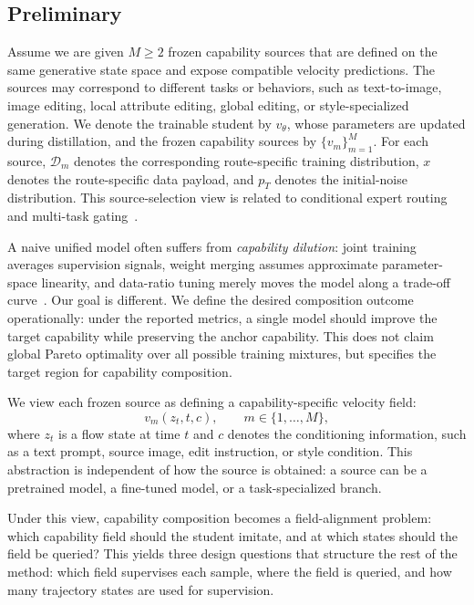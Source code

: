\documentclass{llmxive}
\begin{document}
\subsection{Preliminary}
\label{sec:composition-target}

Assume we are given $M\ge2$ frozen capability sources that are defined on the same generative state space and expose compatible velocity predictions. The sources may correspond to different tasks or behaviors, such as text-to-image, image editing, local attribute editing, global editing, or style-specialized generation. We denote the trainable student by $v_\theta$, whose parameters are updated during distillation, and the frozen capability sources by $\{v_m\}_{m=1}^{M}$. For each source, $\mathcal{D}_m$ denotes the corresponding route-specific training distribution, $x$ denotes the route-specific data payload, and $p_T$ denotes the initial-noise distribution. This source-selection view is related to conditional expert routing and multi-task gating~\cite{jacobs1991adaptive,shazeer2017outrageously,ma2018modeling}.

A naive unified model often suffers from \emph{capability dilution}: joint training averages supervision signals, weight merging assumes approximate parameter-space linearity, and data-ratio tuning merely moves the model along a trade-off curve~\cite{chen2018gradnorm,sener2018multi,yu2020gradient,liu2021conflict}. Our goal is different. We define the desired composition outcome operationally: under the reported metrics, a single model should improve the target capability while preserving the anchor capability. This does not claim global Pareto optimality over all possible training mixtures, but specifies the target region for capability composition.

We view each frozen source as defining a capability-specific velocity field:
\begin{equation}
  v_m(z_t,t,c), \qquad m\in\{1,\ldots,M\},
  \label{eq:cap-field}
\end{equation}
where $z_t$ is a flow state at time $t$ and $c$ denotes the conditioning information, such as a text prompt, source image, edit instruction, or style condition. This abstraction is independent of how the source is obtained: a source can be a pretrained model, a fine-tuned model, or a task-specialized branch.

Under this view, capability composition becomes a field-alignment problem: which capability field should the student imitate, and at which states should the field be queried? This yields three design questions that structure the rest of the method: which field supervises each sample, where the field is queried, and how many trajectory states are used for supervision.
\end{document}
